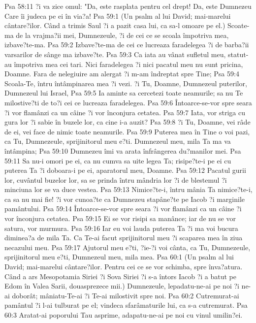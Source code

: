 Psa 58:11  ?i va zice omul: "Da, este rasplata pentru cel drept! Da, este Dumnezeu Care îi judeca pe ei în via?a!
Psa 59:1  (Un psalm al lui David; mai-marelui cântare?ilor. Când a trimis Saul ?i a pazit casa lui, ca sa-l omoare pe el.) Scoate-ma de la vrajma?ii mei, Dumnezeule, ?i de cei ce se scoala împotriva mea, izbave?te-ma.
Psa 59:2  Izbave?te-ma de cei ce lucreaza faradelegea ?i de barba?ii varsarilor de sânge ma izbave?te.
Psa 59:3  Ca iata au vânat sufletul meu, statut-au împotriva mea cei tari. Nici faradelegea ?i nici pacatul meu nu sunt pricina, Doamne. Fara de nelegiuire am alergat ?i m-am îndreptat spre Tine;
Psa 59:4  Scoala-Te, întru întâmpinarea mea ?i vezi. ?i Tu, Doamne, Dumnezeul puterilor, Dumnezeul lui Israel,
Psa 59:5  Ia aminte sa cercetezi toate neamurile; sa nu Te milostive?ti de to?i cei ce lucreaza faradelegea.
Psa 59:6  Întoarce-se-vor spre seara ?i vor flamânzi ca un câine ?i vor înconjura cetatea.
Psa 59:7  Iata, vor striga cu gura lor ?i sabie în buzele lor, ca cine i-a auzit?
Psa 59:8  ?i Tu, Doamne, vei râde de ei, vei face de nimic toate neamurile.
Psa 59:9  Puterea mea în Tine o voi pazi, ca Tu, Dumnezeule, sprijinitorul meu e?ti. Dumnezeul meu, mila Ta ma va întâmpina;
Psa 59:10  Dumnezeu îmi va arata înfrângerea du?manilor mei.
Psa 59:11  Sa nu-i omori pe ei, ca nu cumva sa uite legea Ta; risipe?te-i pe ei cu puterea Ta ?i doboara-i pe ei, aparatorul meu, Doamne.
Psa 59:12  Pacatul gurii lor, cuvântul buzelor lor, sa se prinda întru mândria lor ?i de blestemul ?i minciuna lor se va duce vestea.
Psa 59:13  Nimice?te-i, întru mânia Ta nimice?te-i, ca sa nu mai fie! ?i vor cunoa?te ca Dumnezeu stapâne?te pe Iacob ?i marginile pamântului.
Psa 59:14  Întoarce-se-vor spre seara ?i vor flamânzi ca un câine ?i vor înconjura cetatea.
Psa 59:15  Ei se vor risipi sa manânce; iar de nu se vor satura, vor murmura.
Psa 59:16  Iar eu voi lauda puterea Ta ?i ma voi bucura diminea?a de mila Ta. Ca Te-ai facut sprijinitorul meu ?i scaparea mea în ziua necazului meu.
Psa 59:17  Ajutorul meu e?ti, ?ie-?i voi cânta, ca Tu, Dumnezeule, sprijinitorul meu e?ti, Dumnezeul meu, mila mea.
Psa 60:1  (Un psalm al lui David; mai-marelui cântare?ilor. Pentru cei ce se vor schimba, spre înva?atura. Când a ars Mesopotamia Siriei ?i Sova Siriei ?i s-a întors Iacob ?i a batut pe Edom în Valea Sarii, douasprezece mii.) Dumnezeule, lepadatu-ne-ai pe noi ?i ne-ai doborât; mâniatu-Te-ai ?i Te-ai milostivit spre noi.
Psa 60:2  Cutremurat-ai pamântul ?i l-ai tulburat pe el; vindeca sfarâmaturile lui, ca s-a cutremurat.
Psa 60:3  Aratat-ai poporului Tau asprime, adapatu-ne-ai pe noi cu vinul umilin?ei.
